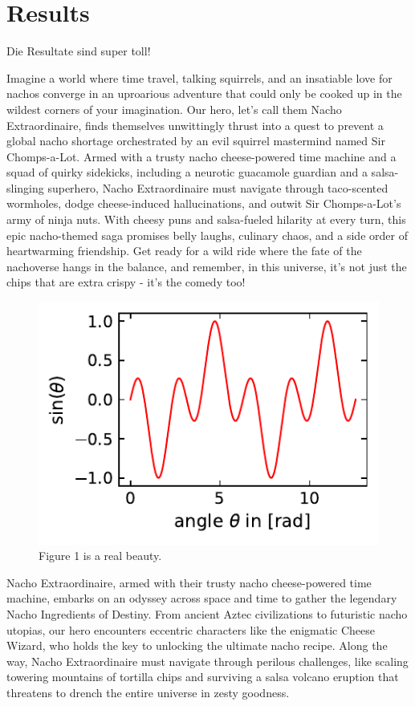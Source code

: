 \section{Results}

Die Resultate sind super toll!

Imagine a world where time travel, talking squirrels, and an insatiable love for nachos converge in an uproarious adventure that could only be cooked up in the wildest corners of your imagination. Our hero, let's call them Nacho Extraordinaire, finds themselves unwittingly thrust into a quest to prevent a global nacho shortage orchestrated by an evil squirrel mastermind named Sir Chomps-a-Lot. Armed with a trusty nacho cheese-powered time machine and a squad of quirky sidekicks, including a neurotic guacamole guardian and a salsa-slinging superhero, Nacho Extraordinaire must navigate through taco-scented wormholes, dodge cheese-induced hallucinations, and outwit Sir Chomps-a-Lot's army of ninja nuts. With cheesy puns and salsa-fueled hilarity at every turn, this epic nacho-themed saga promises belly laughs, culinary chaos, and a side order of heartwarming friendship. Get ready for a wild ride where the fate of the nachoverse hangs in the balance, and remember, in this universe, it's not just the chips that are extra crispy - it's the comedy too!

\begin{figure}[ht]
	\centering
	\includegraphics[scale=1]{../Figures/figure1.pdf}%
	\caption{Figure 1 is a real beauty.}
	\label{fig:figure1}	
\end{figure}


Nacho Extraordinaire, armed with their trusty nacho cheese-powered time machine, embarks on an odyssey across space and time to gather the legendary Nacho Ingredients of Destiny. From ancient Aztec civilizations to futuristic nacho utopias, our hero encounters eccentric characters like the enigmatic Cheese Wizard, who holds the key to unlocking the ultimate nacho recipe. Along the way, Nacho Extraordinaire must navigate through perilous challenges, like scaling towering mountains of tortilla chips and surviving a salsa volcano eruption that threatens to drench the entire universe in zesty goodness.

